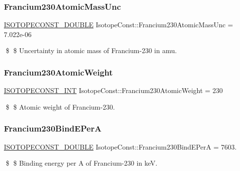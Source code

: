 \subsubsection{\texorpdfstring{Francium230\+Atomic\+Mass\+Unc}{Francium230AtomicMassUnc}}
{\footnotesize\ttfamily \mbox{\hyperlink{group___isotope_const-_macros_ga8f45a7272ce02c0b4c65c44636ed719a}{I\+S\+O\+T\+O\+P\+E\+C\+O\+N\+S\+T\+\_\+\+D\+O\+U\+B\+LE}} Isotope\+Const\+::\+Francium230\+Atomic\+Mass\+Unc = 7.\+022e-\/06}

\$ \$ Uncertainty in atomic mass of Francium-\/230 in amu. \mbox{\label{group___isotope_const-_francium-_fr230_ga8c6d53b7209ee87efb0e5b9b6263e1aa}} 
\subsubsection{\texorpdfstring{Francium230\+Atomic\+Weight}{Francium230AtomicWeight}}
{\footnotesize\ttfamily \mbox{\hyperlink{group___isotope_const-_macros_ga5f18360b3e99483a35c32d789e62621c}{I\+S\+O\+T\+O\+P\+E\+C\+O\+N\+S\+T\+\_\+\+I\+NT}} Isotope\+Const\+::\+Francium230\+Atomic\+Weight = 230}

\$ \$ Atomic weight of Francium-\/230. \mbox{\label{group___isotope_const-_francium-_fr230_gab26b7dac2482a017960433f5ae3c44fd}} 
\subsubsection{\texorpdfstring{Francium230\+Bind\+E\+PerA}{Francium230BindEPerA}}
{\footnotesize\ttfamily \mbox{\hyperlink{group___isotope_const-_macros_ga8f45a7272ce02c0b4c65c44636ed719a}{I\+S\+O\+T\+O\+P\+E\+C\+O\+N\+S\+T\+\_\+\+D\+O\+U\+B\+LE}} Isotope\+Const\+::\+Francium230\+Bind\+E\+PerA = 7603.}

\$ \$ Binding energy per A of Francium-\/230 in keV. \mbox{\label{group___isotope_const-_francium-_fr230_gac8cf2f640a56201bf323604303be85b7}} 
